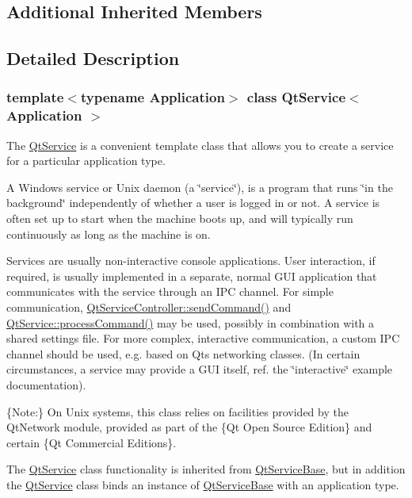 \subsection*{Additional Inherited Members}


\subsection{Detailed Description}
\subsubsection*{template$<$typename Application$>$\newline
class Qt\+Service$<$ Application $>$}

The \hyperlink{class_qt_service}{Qt\+Service} is a convenient template class that allows you to create a service for a particular application type. 

A Windows service or Unix daemon (a \char`\"{}service\char`\"{}), is a program that runs \char`\"{}in the background\char`\"{} independently of whether a user is logged in or not. A service is often set up to start when the machine boots up, and will typically run continuously as long as the machine is on.

Services are usually non-\/interactive console applications. User interaction, if required, is usually implemented in a separate, normal G\+UI application that communicates with the service through an I\+PC channel. For simple communication, \hyperlink{class_qt_service_controller_a1428c7d51403416bc7663ae37c446cfc}{Qt\+Service\+Controller\+::send\+Command()} and \hyperlink{class_qt_service_base_a47485f00f6eba0758d2ffc75092295cf}{Qt\+Service\+::process\+Command()} may be used, possibly in combination with a shared settings file. For more complex, interactive communication, a custom I\+PC channel should be used, e.\+g. based on Qt\textquotesingle{}s networking classes. (In certain circumstances, a service may provide a G\+UI itself, ref. the \char`\"{}interactive\char`\"{} example documentation).

\{Note\+:\} On Unix systems, this class relies on facilities provided by the Qt\+Network module, provided as part of the \{Qt Open Source Edition\} and certain \{Qt Commercial Editions\}.

The \hyperlink{class_qt_service}{Qt\+Service} class functionality is inherited from \hyperlink{class_qt_service_base}{Qt\+Service\+Base}, but in addition the \hyperlink{class_qt_service}{Qt\+Service} class binds an instance of \hyperlink{class_qt_service_base}{Qt\+Service\+Base} with an application type.

